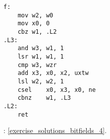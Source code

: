\begin{lstlisting}[caption=\Optimizing GCC 4.9 (ARM64)]
f:
	mov	w2, w0
	mov	x0, 0
	cbz	w1, .L2
.L3:
	and	w3, w1, 1
	lsr	w1, w1, 1
	cmp	w3, wzr
	add	x3, x0, x2, uxtw
	lsl	w2, w2, 1
	csel	x0, x3, x0, ne
	cbnz	w1, .L3
.L2:
	ret
\end{lstlisting}



\Answer{}: \ref{exercise_solutions_bitfields_4}.
